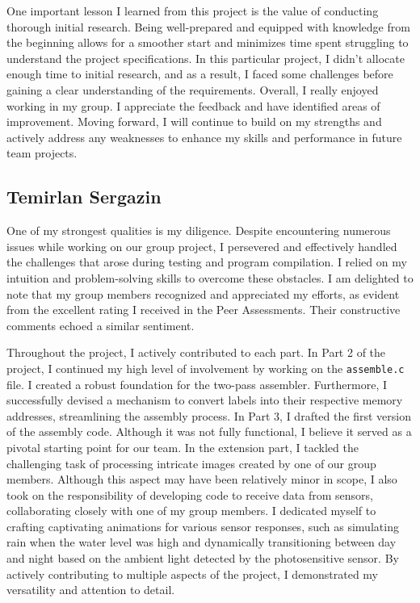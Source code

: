 \documentclass[11pt, oneside, UKenglish]{article}
\begin{document}
One important lesson I learned from this project is the value of conducting thorough initial research.
Being well-prepared and equipped with knowledge from the beginning allows for a smoother start and minimizes time spent struggling to understand the project specifications.
In this particular project, I didn't allocate enough time to initial research, and as a result, I faced some challenges before gaining a clear understanding of the requirements.
Overall, I really enjoyed working in my group. I appreciate the feedback and have identified areas of improvement.
Moving forward, I will continue to build on my strengths and actively address any weaknesses to enhance my skills and performance in future team projects.


\subsection{Temirlan Sergazin}
One of my strongest qualities is my diligence.
Despite encountering numerous issues while working on our group project, I persevered and effectively handled the challenges that arose during testing and program compilation.
I relied on my intuition and problem-solving skills to overcome these obstacles.
I am delighted to note that my group members recognized and appreciated my efforts, as evident from the excellent rating I received in the Peer Assessments.
Their constructive comments echoed a similar sentiment.

Throughout the project, I actively contributed to each part.
In Part 2 of the project, I continued my high level of involvement by working on the 
\verb|assemble.c| file.
I created a robust foundation for the two-pass assembler.
Furthermore, I successfully devised a mechanism to convert labels into their respective memory addresses, streamlining the assembly process.
In Part 3, I drafted the first version of the assembly code. Although it was not fully functional, I believe it served as a pivotal starting point for our team.
In the extension part, I tackled the challenging task of processing intricate images created by one of our group members.
Although this aspect may have been relatively minor in scope, I also took on the responsibility of developing code to receive data from sensors, collaborating closely with one of my group members. I dedicated myself to crafting captivating animations for various sensor responses, such as simulating rain when the water level was high and dynamically transitioning between day and night based on the ambient light detected by the photosensitive sensor. By actively contributing to multiple aspects of the project, I demonstrated my versatility and attention to detail.
\end{document}
